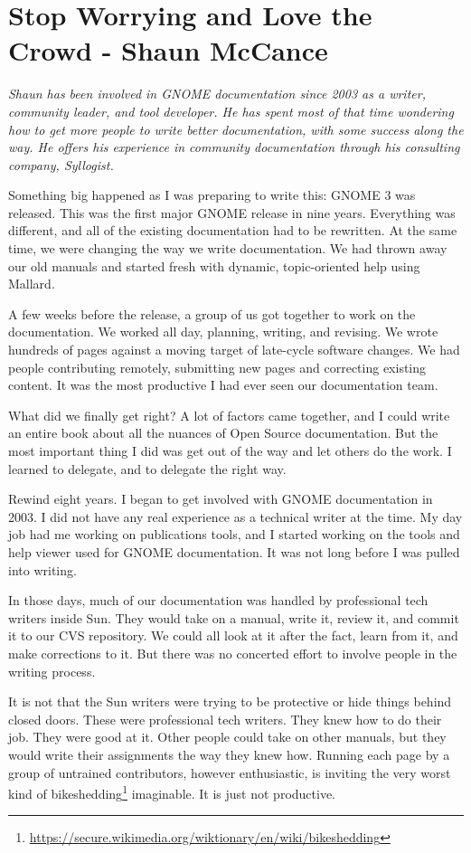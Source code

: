 \chapter{Stop Worrying and Love the Crowd - Shaun McCance}

\textit{Shaun has been involved in GNOME documentation since 2003
as a writer, community leader, and tool developer. He has spent
most of that time wondering how to get more people to write better
documentation, with some success along the way. He offers his
experience in community documentation through his consulting
company, Syllogist.}

Something big happened as I was preparing to write this: GNOME 3 was released.
This was the first major GNOME release in nine years. Everything was different,
and all of the existing documentation had to be rewritten. At the same time, we
were changing the way we write documentation. We had thrown away our old manuals
and started fresh with dynamic, topic-oriented help using Mallard.

A few weeks before the release, a group of us got together to work on the
documentation. We worked all day, planning, writing, and revising. We wrote
hundreds of pages against a moving target of late-cycle software changes. We
had people contributing remotely, submitting new pages and correcting existing
content. It was the most productive I had ever seen our documentation team.

What did we finally get right? A lot of factors came together, and I could
write an entire book about all the nuances of Open Source documentation.
But the most important thing I did was get out of the way and let others
do the work. I learned to delegate, and to delegate the right way.

Rewind eight years. I began to get involved with GNOME documentation in 2003.
I did not have any real experience as a technical writer at the time. My day
job had me working on publications tools, and I started working on the tools
and help viewer used for GNOME documentation. It was not long before I was
pulled into writing.

In those days, much of our documentation was handled by professional tech
writers inside Sun. They would take on a manual, write it, review it, and
commit it to our CVS repository. We could all look at it after the fact,
learn from it, and make corrections to it. But there was no concerted
effort to involve people in the writing process.

It is not that the Sun writers were trying to be protective or hide things
behind closed doors. These were professional tech writers. They knew how
to do their job. They were good at it. Other people could take on other
manuals, but they would write their assignments the way they knew how.
Running each page by a group of untrained contributors, however
enthusiastic, is inviting the very worst kind of bikeshedding\footnote{\url{https://secure.wikimedia.org/wiktionary/en/wiki/bikeshedding}}
imaginable. It is just not productive.

